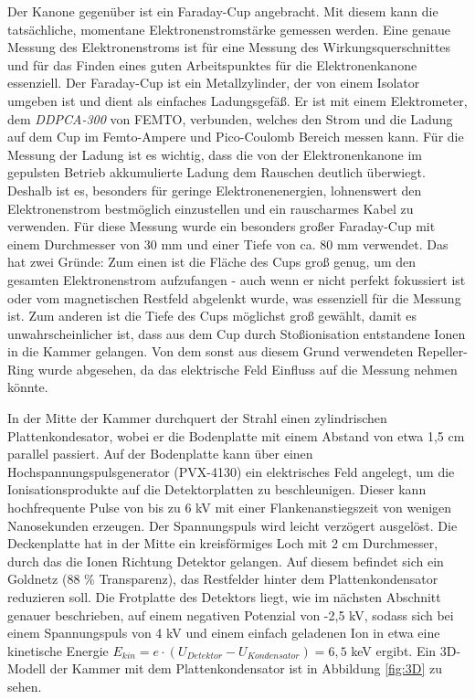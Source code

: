 Der Kanone gegenüber ist ein Faraday-Cup angebracht. Mit diesem kann die tatsächliche, momentane Elektronenstromstärke gemessen werden. Eine genaue Messung des Elektronenstroms ist für eine Messung des Wirkungsquerschnittes und für das Finden eines guten Arbeitspunktes für die Elektronenkanone essenziell. Der Faraday-Cup ist ein Metallzylinder, der von einem Isolator umgeben ist und dient als einfaches Ladungsgefäß. Er ist mit einem Elektrometer, dem \textit{DDPCA-300} von FEMTO, verbunden, welches den Strom und die Ladung auf dem Cup im Femto-Ampere und Pico-Coulomb Bereich messen kann. Für die Messung der Ladung ist es wichtig, dass die von der Elektronenkanone im gepulsten Betrieb akkumulierte Ladung dem Rauschen deutlich überwiegt. Deshalb ist es, besonders für geringe Elektronenenergien, lohnenswert den Elektronenstrom bestmöglich einzustellen und ein rauscharmes Kabel zu verwenden. Für diese Messung wurde ein besonders großer Faraday-Cup mit einem Durchmesser von 30 mm und einer Tiefe von ca. 80 mm verwendet. Das hat zwei Gründe: Zum einen ist die Fläche des Cups groß genug, um den gesamten Elektronenstrom aufzufangen - auch wenn er nicht perfekt fokussiert ist oder vom magnetischen Restfeld abgelenkt wurde, was essenziell für die Messung ist. Zum anderen ist die Tiefe des Cups möglichst groß gewählt, damit es unwahrscheinlicher ist, dass aus dem Cup durch Stoßionisation entstandene Ionen in die Kammer gelangen. Von dem sonst aus diesem Grund verwendeten Repeller-Ring wurde abgesehen, da das elektrische Feld Einfluss auf die Messung nehmen könnte.

In der Mitte der Kammer durchquert der Strahl einen zylindrischen Plattenkondesator, wobei er die Bodenplatte mit einem Abstand von etwa 1,5 cm parallel passiert. Auf der Bodenplatte kann über einen Hochspannungspulsgenerator (PVX-4130) ein elektrisches Feld angelegt, um die Ionisationsprodukte auf die Detektorplatten zu beschleunigen. Dieser kann hochfrequente Pulse von bis zu 6 kV mit einer Flankenanstiegszeit von wenigen Nanosekunden erzeugen. Der Spannungspuls wird leicht verzögert ausgelöst. Die Deckenplatte hat in der Mitte ein kreisförmiges Loch mit 2 cm Durchmesser, durch das die Ionen Richtung Detektor gelangen. Auf diesem befindet sich ein Goldnetz (88 \% Transparenz), das Restfelder hinter dem Plattenkondensator reduzieren soll. Die Frotplatte des Detektors liegt, wie im nächsten Abschnitt genauer beschrieben, auf einem negativen Potenzial von -2,5 kV, sodass sich bei einem Spannungspuls von 4 kV und einem einfach geladenen Ion in etwa eine kinetische Energie $E_{kin} = e \cdot (U_{Detektor} - U_{Kondensator}) = 6,5$ keV ergibt. Ein 3D-Modell der Kammer mit dem Plattenkondensator ist in Abbildung \ref{fig:3D} zu sehen.

